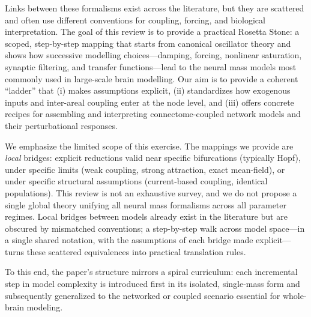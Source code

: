 \documentclass[12pt]{article}
\numberwithin{equation}{section}
\newcommand{\rev}[1]{\begingroup\color{navyblue}#1\endgroup}
\begin{document}
\rev{Links between these formalisms exist across the literature, but they are scattered and often use different conventions for coupling, forcing, and biological interpretation. The goal of this review is to provide a practical Rosetta Stone: a scoped, step-by-step mapping that starts from canonical oscillator theory and shows how successive modelling choices—damping, forcing, nonlinear saturation, synaptic filtering, and transfer functions—lead to the neural mass models most commonly used in large-scale brain modelling. Our aim is to provide a coherent “ladder” that (i) makes assumptions explicit, (ii) standardizes how exogenous inputs and inter-areal coupling enter at the node level, and (iii) offers concrete recipes for assembling and interpreting connectome-coupled network models and their perturbational responses.

We emphasize the limited scope of this exercise. The mappings we provide are \emph{local} bridges: explicit reductions valid near specific bifurcations (typically Hopf), under specific limits (weak coupling, strong attraction, exact mean-field), or under specific structural assumptions (current-based coupling, identical populations). This review is not an exhaustive survey, and we do not propose a single global theory unifying all neural mass formalisms across all parameter regimes. Local bridges between models already exist in the literature but are obscured by mismatched conventions; a step-by-step walk across model space---in a single shared notation, with the assumptions of each bridge made explicit---turns these scattered equivalences into practical translation rules.}

To this end, the paper's structure mirrors a spiral curriculum: each incremental step in model complexity is introduced first in its isolated, single-mass form and subsequently generalized to the networked or coupled scenario essential for whole-brain modeling.  
\end{document}
